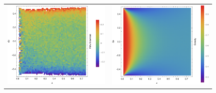 \begin{figure}[h!]
\begin{center}
\begin{tabular}{c|c}
    \includegraphics[width=0.5\linewidth]{../tex-src/images/constDens/skewFlow-crop} & \includegraphics[width=0.5\linewidth]{../tex-src/images/constDens/meanDens-crop} \\
    \end{tabular}
\end{center}
    \vspace{-0em}
\end{figure}



